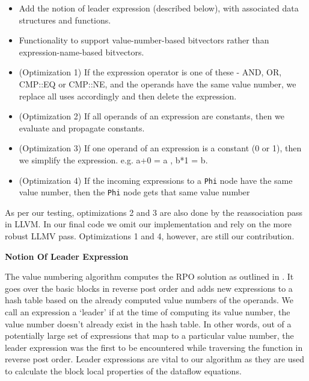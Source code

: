 \documentclass[10pt,twoside]{report}
\begin{document}
\begin{itemize}     
  \item Add the notion of leader expression (described below), with associated
  data structures and functions. 
  \item Functionality to support value-number-based bitvectors rather than
  expression-name-based bitvectors. 
  \item (Optimization 1) If the expression operator is one of these - AND, OR, CMP::EQ
  or CMP::NE, and the operands have the same value number, we replace all uses
  accordingly and then delete the expression.
  \item (Optimization 2) If all operands of an expression are constants, then we 
  evaluate and propagate constants. 
  \item (Optimization 3) If one operand of an expression is a constant (0 or 1), then 
  we simplify the expression. e.g. {a+0 = a} , {b*1 = b}.
  \item (Optimization 4) If the incoming expressions to a \texttt{Phi} node have the same value 
  number, then the \texttt{Phi} node gets that same value number
\end{itemize}  
  As per our testing, optimizations 2 and 3 are also done by the reassociation
  pass in LLVM. In our final code we omit our implementation and rely on the
  more robust LLMV pass. Optimizations 1 and 4, however, are still our contribution.

\begin{flushleft}
\textbf{\large{Notion Of Leader Expression}}
\end{flushleft}
The value numbering algorithm computes the RPO solution as outlined in
\cite{Cooper95scc-basedvalue}. It goes over the basic blocks in reverse post
order and adds new expressions to a hash table based on the already computed
value numbers of the operands. We call an expression a `leader' if at the time
of computing its value number, the value number doesn't already exist in the
hash table. In other words, out of a potentially large set of expressions that
map to a particular value number, the leader expression was the first to be
encountered while traversing the function in reverse post order. Leader
expressions are vital to our algorithm as they are used to calculate the block
local properties of the dataflow equations.
\end{document}
